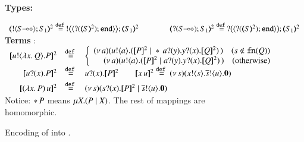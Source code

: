 \begin{figure}[t]
{\bf Types:}

$
	\begin{array}{c}
		\tmap{\btout{\lhot{S}}S_1}{2} \defeq \bbtout{\chtype{\btinp{\tmap{S}{2}}\tinact}}\tmap{S_1}{2}
		\qquad
		\qquad
		\tmap{\btinp{\lhot{S}}S_1}{2} \defeq \bbtinp{\chtype{\btinp{\tmap{S}{2}}\tinact}}\tmap{S_1}{2}
	\end{array}
$
\\[2mm]
{\bf Terms} :
\\
$
\begin{array}{rcll}
	\pmap{\bout{u}{\abs{x}{Q}} P}{2} & \defeq  &
	\left\{
	\begin{array}{r}
		\newsp{a}{\bout{u}{a} (\pmap{P}{2} \Par \repl{} \binp{a}{y} \binp{y}{x} \pmap{Q}{2})\,}\quad
		(s \notin \fn{Q})
		\\
		\newsp{a}{\bout{u}{a} (\pmap{P}{2} \Par \binp{a}{y} \binp{y}{x} \pmap{Q}{2})\,}\quad
		\textrm{(otherwise)} %
	\end{array}
	\right.
	\\[1mm]

	\pmap{\binp{u}{x} P}{2} &\defeq&  \binp{u}{x} \pmap{P}{2}
	\qquad
	\pmap{\appl{x}{u}}{2} \defeq \newsp{s}{\bout{x}{s} \bout{\dual{s}}{u} \inact}
	\\[1mm]

	\pmap{\appl{(\abs{x}{P})}{u}}{2} & \defeq & %
	\newsp{s}{\binp{s}{x} \pmap{P}{2} \Par \bout{\dual{s}}{u} \inact}
\end{array}
$
\\[2mm]
{Notice: $\repl{} P$ means $\recp{X}{(P \Par \rvar{X})}$. The rest of mappings are homomorphic.}
\vspace{-1mm}
\caption{Encoding of \HOp into \sessp. \label{f:enc:ho_to_sessp}}
\vspace{-1mm}
\end{figure}

